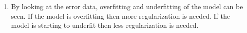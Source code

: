 \begin{enumerate}
\begin{enumerate}
          \item
            By looking at the error data, overfitting and underfitting of the model can be seen.
            If the model is overfitting then more regularization is needed.
            If the model is starting to underfit then less regularization is needed.
      \end{enumerate}
\end{enumerate}
